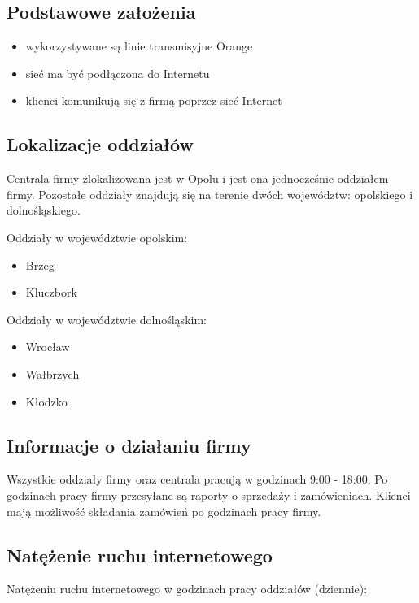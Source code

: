 \documentclass[a4paper]{article}
\begin{document}
\subsection{Podstawowe założenia}

\begin{itemize}
	\item wykorzystywane są linie transmisyjne Orange
	\item sieć ma być podłączona do Internetu
	\item klienci komunikują się z firmą poprzez sieć Internet
\end{itemize}

\subsection{Lokalizacje oddziałów}

Centrala firmy zlokalizowana jest w Opolu i jest ona jednocześnie oddziałem firmy. Pozostałe oddziały znajdują się na terenie dwóch województw: opolskiego i dolnośląskiego.

Oddziały w województwie opolskim:

\begin{itemize}
	\item Brzeg
	\item Kluczbork
\end{itemize}

Oddziały w województwie dolnośląskim:

\begin{itemize}
	\item Wrocław
    \item Wałbrzych
    \item Kłodzko
\end{itemize}

\subsection{Informacje o działaniu firmy}

Wszystkie oddziały firmy oraz centrala pracują w godzinach 9:00 - 18:00. Po godzinach pracy firmy przesyłane są raporty o sprzedaży i zamówieniach. Klienci mają możliwość składania zamówień po godzinach pracy firmy.

\subsection{Natężenie ruchu internetowego}

Natężeniu ruchu internetowego w godzinach pracy oddziałów (dziennie):
\end{document}

